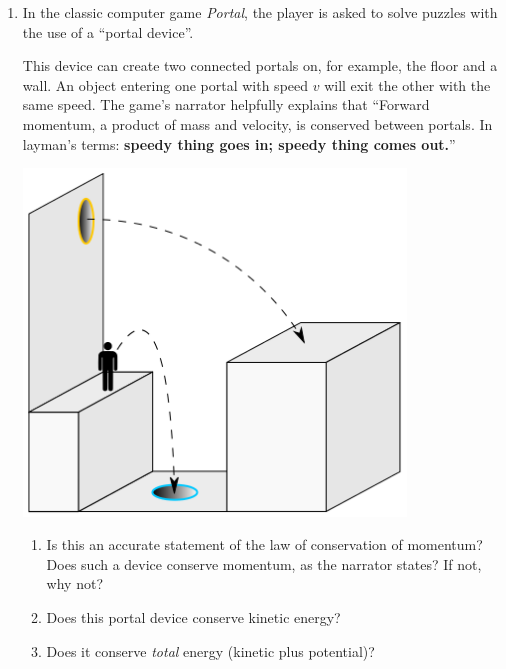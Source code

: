 \documentclass[12pt]{article}
\begin{document}
\Large
\centerline{}

\normalsize
\centerline{}

\begin{enumerate}


\item{In the classic computer game {\it Portal}, the player is asked to solve
	puzzles with the use of a ``portal device''.
	

\begin{minipage}{0.4\textwidth}
	This device can create two connected portals
	on, for example, the floor and a wall. An object entering one portal with speed $v$
	will exit the other with the same speed. 
	The game's narrator helpfully explains that ``Forward momentum, a product of mass
	and velocity, is conserved between portals. In layman's terms: {\bf speedy thing
		goes in; speedy thing comes out.}''
	\end{minipage}
	\begin{minipage}{0.5\textwidth}
		\hspace{0.1\textwidth}
	\includegraphics[width=0.8\textwidth]{Portal_physics-2.png}
\end{minipage}
	\begin{enumerate}
	\item Is this an accurate statement of the law of conservation of momentum? Does such a device conserve momentum, as the narrator states? If not, why not?
	
	\item Does this portal device conserve kinetic energy?
	
	\item Does it conserve {\it total} energy (kinetic plus potential)?
	\end{enumerate}
	
}
\end{enumerate}
\end{document}
